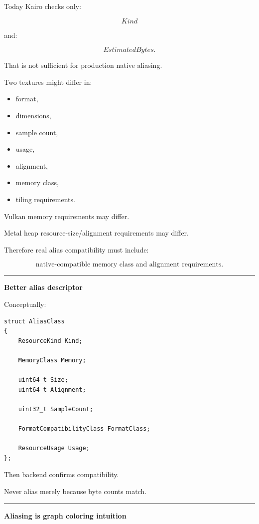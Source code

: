 Today Kairo checks only:

\[
Kind
\]

and:

\[
EstimatedBytes.
\]

That is not sufficient for production native aliasing.

Two textures might differ in:

\begin{itemize}
\tightlist
\item
  format,
\item
  dimensions,
\item
  sample count,
\item
  usage,
\item
  alignment,
\item
  memory class,
\item
  tiling requirements.
\end{itemize}

Vulkan memory requirements may differ.

Metal heap resource-size/alignment requirements may differ.

Therefore real alias compatibility must include:

\[
\boxed{
\text{native-compatible memory class and alignment requirements}.
}
\]

\begin{center}\rule{0.5\linewidth}{0.5pt}\end{center}

\textbf{Better alias descriptor}

Conceptually:

\begin{verbatim}
struct AliasClass
{
    ResourceKind Kind;

    MemoryClass Memory;

    uint64_t Size;
    uint64_t Alignment;

    uint32_t SampleCount;

    FormatCompatibilityClass FormatClass;

    ResourceUsage Usage;
};
\end{verbatim}

Then backend confirms compatibility.

Never alias merely because byte counts match.

\begin{center}\rule{0.5\linewidth}{0.5pt}\end{center}

\textbf{Aliasing is graph coloring intuition}

